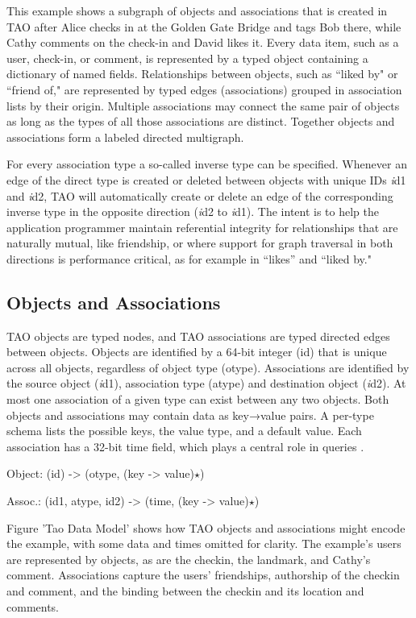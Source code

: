 \documentclass[9pt,twocolumn,twoside]{../../styles/osajnl}
\begin{document}
This example shows a subgraph of objects and associations that is created in TAO after Alice checks in at the Golden Gate Bridge and tags Bob there, while Cathy comments on the check-in and David likes it. Every data item, such as a user, check-in, or comment, is represented by a typed object containing a dictionary of named fields. Relationships between objects, such as “liked by" or “friend of," are represented by typed edges (associations) grouped in association lists by their origin. Multiple associations may connect the same pair of objects as long as the types of all those associations are distinct. Together objects and associations form a labeled directed multigraph.

For every association type a so-called inverse type can be specified. Whenever an edge of the direct type is created or deleted between objects with unique IDs \emph id1 and \emph id2, TAO will automatically create or delete an edge of the corresponding inverse type in the opposite direction (\emph id2 to \emph id1). The intent is to help the application programmer maintain referential integrity for relationships that are naturally mutual, like friendship, or where support for graph traversal in both directions is performance critical, as for example in “likes” and “liked by."

\subsection{Objects and Associations}
TAO objects are typed nodes, and TAO associations are typed directed edges between objects. Objects are identified by a 64-bit integer (id) that is unique across all objects, regardless of object type (otype). Associations are identified by the source object (\emph id1), association type (atype) and destination object (\emph id2). At most one association of a given type can exist between any two objects. Both objects and associations may contain data as key→value pairs. A per-type schema lists the possible keys, the value type, and a default value. Each association has a 32-bit time field, which plays a central
role in queries \cite{book-tao1}.

Object: (id) -> (otype, (key -> value)$\star$)

Assoc.: (id1, atype, id2) -> (time, (key -> value)$\star$)

Figure 'Tao Data Model' shows how TAO objects and associations might encode the example, with some data and times omitted for clarity. The example’s users are represented by objects, as are the checkin, the landmark, and Cathy’s comment. Associations capture the users’ friendships, authorship of the checkin and comment, and the binding between the checkin and its location and comments.
\end{document}
